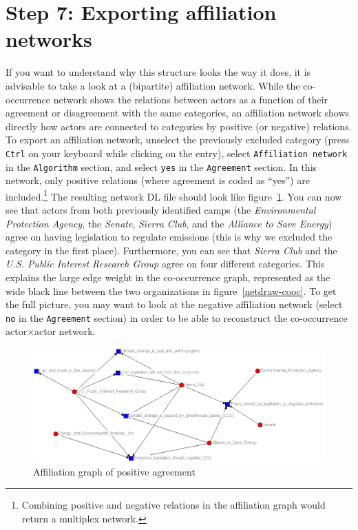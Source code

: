 \documentclass[12pt,a4paper]{scrreprt}
\newcommand{\code}[1]{\texttt{#1}}
\begin{document}
\section*{Step 7: Exporting affiliation networks}
If you want to understand why this structure looks the way it does, it is advisable to take a look at a (bipartite) affiliation network. While the co-occurrence network shows the relations between actors as a function of their agreement or disagreement with the same categories, an affiliation network shows directly how actors are connected to categories by positive (or negative) relations. To export an affiliation network, unselect the previously excluded category (press \code{Ctrl} on your keyboard while clicking on the entry), select \code{Affiliation network} in the \code{Algorithm} section, and select \code{yes} in the \code{Agreement} section. In this network, only positive relations (where agreement is coded as ``yes'') are included.\footnote{Combining positive and negative relations in the affiliation graph would return a multiplex network.} The resulting network DL file should look like figure~\ref{netdraw-affil}. You can now see that actors from both previously identified camps (the \emph{Environmental Protection Agency}, the \emph{Senate}, \emph{Sierra Club}, and the \emph{Alliance to Save Energy}) agree on having legislation to regulate emissions (this is why we excluded the category in the first place). Furthermore, you can see that \emph{Sierra Club} and the \emph{U.S. Public Interest Research Group} agree on four different categories. This explains the large edge weight in the co-occurrence graph, represented as the wide black line between the two organizations in figure~\ref{netdraw-cooc}. To get the full picture, you may want to look at the negative affiliation network (select \code{no} in the \code{Agreement} section) in order to be able to reconstruct the co-occurrence actor$\times$actor network.
\begin{figure}
 \begin{center}
  \includegraphics[scale=0.4]{netdraw-affil-yes.png}
 \end{center}
 \caption{Affiliation graph of positive agreement}
 \label{netdraw-affil}
\end{figure}
\end{document}
